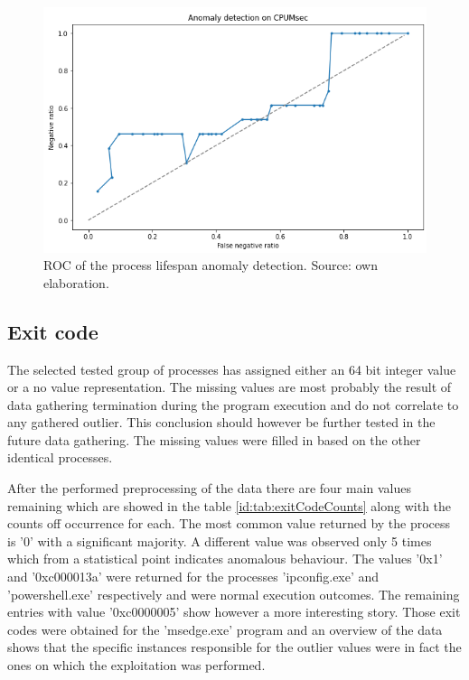 \documentclass[a4paper,twoside,12pt]{book}
\begin{document}
\begin{figure}
	\centering
	\includegraphics[scale=0.9]{images/ROCCPUMsec}
	\caption{ROC of the process lifespan anomaly detection. Source: own elaboration.}
	\label{fig:CPUMsecROC}
 \end{figure}

\subsection{Exit code}

The selected tested group of processes has assigned either an 64 bit integer value or a no value representation.
The missing values are most probably the result of data gathering termination during the program execution and
do not correlate to any gathered outlier. This conclusion should however be further tested in the future data gathering.
The missing values were filled in based on the other identical processes.

After the performed preprocessing of the data there are four main values remaining which are showed in the table \ref{id:tab:exitCodeCounts}
along with the counts off occurrence for each. The most common value returned by the process is '0' with a significant majority. A different 
value was observed only 5 times which from a statistical point indicates anomalous behaviour. The values '0x1' and '0xc000013a' were
returned for the processes 'ipconfig.exe' and 'powershell.exe' respectively and were normal execution outcomes. The remaining 
entries with value '0xc0000005' show however a more interesting story. Those exit codes were obtained for the 'msedge.exe' program
and an overview of the data shows that the specific instances responsible for the outlier values were in fact the ones on which the 
exploitation was performed. 
\end{document}
